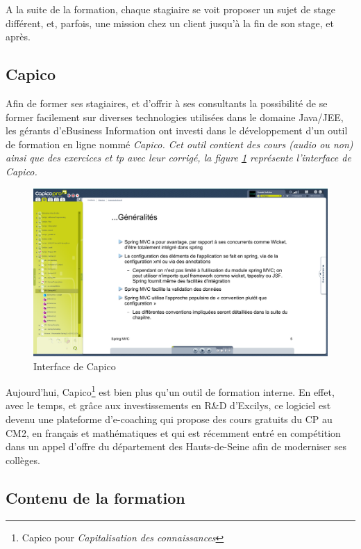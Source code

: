 A la suite de la formation, chaque stagiaire se voit proposer un sujet de stage différent, et, parfois, une mission chez un client jusqu'à la fin de son stage, et après. 

\subsection{Capico}

Afin de former ses stagiaires, et d'offrir à ses consultants la possibilité de se former facilement sur diverses technologies utilisées dans le domaine Java/JEE, les gérants d'eBusiness Information ont investi dans le développement d'un outil de formation en ligne nommé \em{Capico}. Cet outil contient des cours (audio ou non) ainsi que des exercices et tp avec leur corrigé, la figure \ref{capico} représente l'interface de Capico.

\begin{figure}[ht]
\begin{center}
\includegraphics[width=400pt]{img/capico.png}
\end{center}
\caption{Interface de Capico}
\label{capico}
\end{figure}

Aujourd'hui, Capico\footnote{Capico pour \em{Capi}talisation des \em{co}nnaissances} est bien plus qu'un outil de formation interne. En effet, avec le temps, et grâce aux investissements en R\&D d'Excilys, ce logiciel est devenu une plateforme d'e-coaching qui propose des cours gratuits du CP au CM2, en français et mathématiques et qui est récemment entré en compétition dans un appel d'offre du département des Hauts-de-Seine afin de moderniser ses collèges.  

\subsection{Contenu de la formation}

